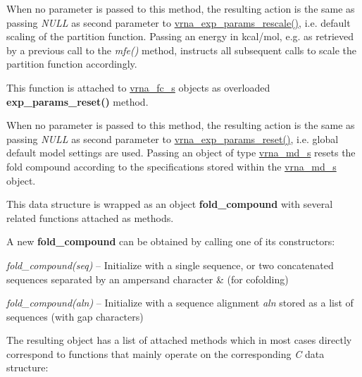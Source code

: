 \begin{DoxyRefList}
When no parameter is passed to this method, the resulting action is the same as passing {\itshape N\+U\+LL} as second parameter to \mbox{\hyperlink{group__energy__parameters_gad607bc3a5b5da16400e2ca4ea5560233}{vrna\+\_\+exp\+\_\+params\+\_\+rescale()}}, i.\+e. default scaling of the partition function. Passing an energy in kcal/mol, e.\+g. as retrieved by a previous call to the {\itshape mfe()} method, instructs all subsequent calls to scale the partition function accordingly.  
\item[\label{wrappers__wrappers000082}%
\Hypertarget{wrappers__wrappers000082}%
Global \mbox{\hyperlink{group__energy__parameters_gaa5409218068be84d7b50c78fbdaa85a9}{vrna\+\_\+exp\+\_\+params\+\_\+reset}} (vrna\+\_\+fold\+\_\+compound\+\_\+t $\ast$vc, vrna\+\_\+md\+\_\+t $\ast$md\+\_\+p)]This function is attached to \mbox{\hyperlink{group__fold__compound_structvrna__fc__s}{vrna\+\_\+fc\+\_\+s}} objects as overloaded {\bfseries exp\+\_\+params\+\_\+reset()} method.

When no parameter is passed to this method, the resulting action is the same as passing {\itshape N\+U\+LL} as second parameter to \mbox{\hyperlink{group__energy__parameters_gaa5409218068be84d7b50c78fbdaa85a9}{vrna\+\_\+exp\+\_\+params\+\_\+reset()}}, i.\+e. global default model settings are used. Passing an object of type \mbox{\hyperlink{group__model__details_structvrna__md__s}{vrna\+\_\+md\+\_\+s}} resets the fold compound according to the specifications stored within the \mbox{\hyperlink{group__model__details_structvrna__md__s}{vrna\+\_\+md\+\_\+s}} object.  
\item[\label{wrappers__wrappers000067}%
\Hypertarget{wrappers__wrappers000067}%
Class \mbox{\hyperlink{group__fold__compound}{vrna\+\_\+fc\+\_\+s}} ]

This data structure is wrapped as an object {\bfseries fold\+\_\+compound} with several related functions attached as methods.

A new {\bfseries fold\+\_\+compound} can be obtained by calling one of its constructors\+:~\newline

\begin{DoxyItemize}
\item {\itshape fold\+\_\+compound(seq)} -- Initialize with a single sequence, or two concatenated sequences separated by an ampersand character \textquotesingle{}\&\textquotesingle{} (for cofolding)
\item {\itshape fold\+\_\+compound(aln)} -- Initialize with a sequence alignment {\itshape aln} stored as a list of sequences (with gap characters)
\end{DoxyItemize}The resulting object has a list of attached methods which in most cases directly correspond to functions that mainly operate on the corresponding {\itshape C} data structure\+:~\newline


\end{DoxyRefList}
